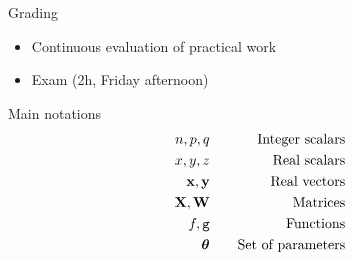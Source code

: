 \documentclass[xcolor=pdftex,dvipsnames,table,mathserif]{beamer}
\begin{document}


\begin{frame}{Grading}

\begin{itemize}
\item Continuous evaluation of practical work
\item Exam (2h, Friday afternoon)
\end{itemize}

\end{frame}

\begin{frame}{Main notations}
  \begin{eqnarray*}
    n, p, q & \hspace{1em} & \text{Integer scalars} \\
    x, y, z & \hspace{1em} & \text{Real scalars} \\
    \mathbf{x}, \mathbf{y} & \hspace{1em} & \text{Real vectors} \\
    \mathbf{X}, \mathbf{W} & \hspace{1em} & \text{Matrices} \\
    f, \texttt{g} & \hspace{1em} & \text{Functions} \\
    \boldsymbol{\theta} & \hspace{1em} & \text{Set of parameters} \\
    \end{eqnarray*}
\end{frame}











\end{document}
